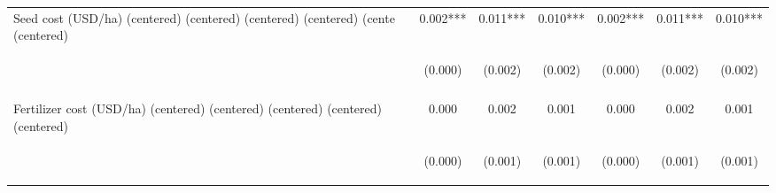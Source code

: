 \begin{center}
\begin{tabular}{lcccccc}
Seed cost (USD/ha) (centered) (centered) (centered) (centered) (cente (centered) & 0.002*** & 0.011*** & 0.010*** & 0.002*** & 0.011*** & 0.010*** \\
 & \begin{footnotesize}(0.000)\end{footnotesize} & \begin{footnotesize}(0.002)\end{footnotesize} & \begin{footnotesize}(0.002)\end{footnotesize} & \begin{footnotesize}(0.000)\end{footnotesize} & \begin{footnotesize}(0.002)\end{footnotesize} & \begin{footnotesize}(0.002)\end{footnotesize} \\
\vspace{4pt} & \begin{footnotesize}[0.000]\end{footnotesize} & \begin{footnotesize}[0.000]\end{footnotesize} & \begin{footnotesize}[0.000]\end{footnotesize} & \begin{footnotesize}[0.000]\end{footnotesize} & \begin{footnotesize}[0.000]\end{footnotesize} & \begin{footnotesize}[0.000]\end{footnotesize} \\
Fertilizer cost (USD/ha) (centered) (centered) (centered) (centered)  (centered) & 0.000 & 0.002 & 0.001 & 0.000 & 0.002 & 0.001 \\
 & \begin{footnotesize}(0.000)\end{footnotesize} & \begin{footnotesize}(0.001)\end{footnotesize} & \begin{footnotesize}(0.001)\end{footnotesize} & \begin{footnotesize}(0.000)\end{footnotesize} & \begin{footnotesize}(0.001)\end{footnotesize} & \begin{footnotesize}(0.001)\end{footnotesize} \\

\end{tabular}
\end{center}
